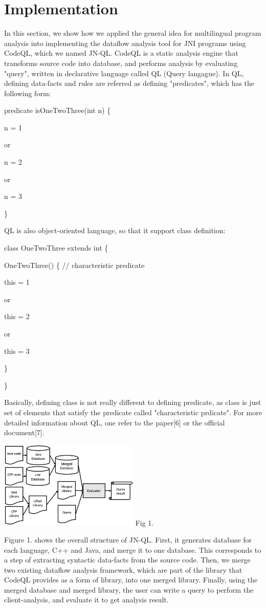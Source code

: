 \section{Implementation}
In this section, we show how we applied the general idea for multilingual
program analysis into implementing the dataflow analysis tool for JNI programs
using CodeQL, which we named JN-QL. CodeQL is a static analysis engine that
transforms source code into database, and performs analysis by evaluating
"query", written in declarative language called QL (Query langague). In QL,
defining data-facts and rules are referred as defining "predicates", which has
the following form:

predicate isOneTwoThree(int n) \{

  n = 1

  or

  n = 2

  or

  n = 3

\}

QL is also object-oriented language, so that it support class definition:

class OneTwoThree extends int \{
  
  OneTwoThree() \{ // characteristic predicate
    
    this = 1

    or

    this = 2

    or

    this = 3
  
  \}

\}

Basically, defining class is not really different to defining predicate,
as class is just set of elements that satisfy the predicate called
"characteristic prdicate". For more detailed information about QL, one
refer to the paper[6] or the official document[7].

\includegraphics[width=0.5\textwidth]{img/Fig1}
Fig 1.

Figure 1. shows the overall structure of JN-QL. First, it generates database
for each language, C++ and Java, and merge it to one database. This corresponds to a step of
extracting syntactic data-facts from the source code. Then, we merge two
existing dataflow analysis framework, which are part of the library that 
CodeQL provides as a form of library, into one merged library. Finally, using the
merged database and merged library, the user can write a query to perform the
client-analysis, and evaluate it to get analysis result.

